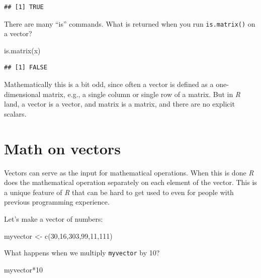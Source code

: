 \documentclass[
]{book}
\newenvironment{Shaded}{\begin{snugshade}}{\end{snugshade}}
\newcommand{\DecValTok}[1]{\textcolor[rgb]{0.00,0.00,0.81}{#1}}
\newcommand{\FunctionTok}[1]{\textcolor[rgb]{0.00,0.00,0.00}{#1}}
\newcommand{\NormalTok}[1]{#1}
\newcommand{\OtherTok}[1]{\textcolor[rgb]{0.56,0.35,0.01}{#1}}
\newcommand{\SpecialCharTok}[1]{\textcolor[rgb]{0.00,0.00,0.00}{#1}}
\begin{document}
\begin{verbatim}
## [1] TRUE
\end{verbatim}

There are many ``is'' commands. What is returned when you run \texttt{is.matrix()} on a vector?

\begin{Shaded}
\begin{Highlighting}[]
\FunctionTok{is.matrix}\NormalTok{(x)}
\end{Highlighting}
\end{Shaded}

\begin{verbatim}
## [1] FALSE
\end{verbatim}

Mathematically this is a bit odd, since often a vector is defined as a one-dimensional matrix, e.g., a single column or single row of a matrix. But in \emph{R} land, a vector is a vector, and matrix is a matrix, and there are no explicit scalars.

\hypertarget{math-on-vectors}{%
\section{Math on vectors}\label{math-on-vectors}}

Vectors can serve as the input for mathematical operations. When this is done \emph{R} does the mathematical operation separately on each element of the vector. This is a unique feature of \emph{R} that can be hard to get used to even for people with previous programming experience.

Let's make a vector of numbers:

\begin{Shaded}
\begin{Highlighting}[]
\NormalTok{myvector }\OtherTok{\textless{}{-}} \FunctionTok{c}\NormalTok{(}\DecValTok{30}\NormalTok{,}\DecValTok{16}\NormalTok{,}\DecValTok{303}\NormalTok{,}\DecValTok{99}\NormalTok{,}\DecValTok{11}\NormalTok{,}\DecValTok{111}\NormalTok{)}
\end{Highlighting}
\end{Shaded}

What happens when we multiply \texttt{myvector} by 10?

\begin{Shaded}
\begin{Highlighting}[]
\NormalTok{myvector}\SpecialCharTok{*}\DecValTok{10}
\end{Highlighting}
\end{Shaded}
\end{document}
